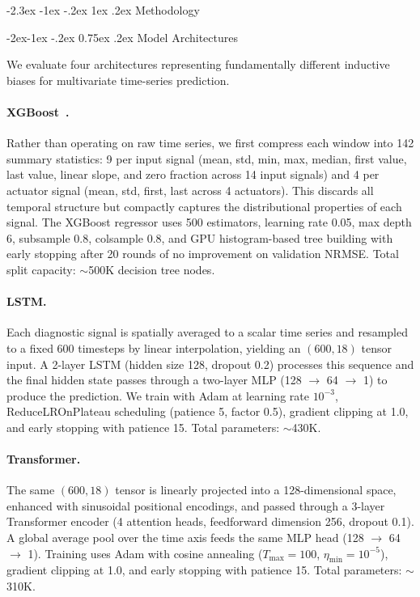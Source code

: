 \documentclass[10pt,twocolumn]{article}
\makeatletter
\renewcommand\section{\@startsection{section}{1}{\z@}%
  {-2.3ex \@plus -1ex \@minus -.2ex}%
  {1ex \@plus .2ex}%
  {\normalfont\Large\bfseries}}
\renewcommand\subsection{\@startsection{subsection}{2}{\z@}%
  {-2ex\@plus -1ex \@minus -.2ex}%
  {0.75ex \@plus .2ex}%
  {\normalfont\large\bfseries}}
\makeatother
\begin{document}
\section{Methodology}

\subsection{Model Architectures}

We evaluate four architectures representing fundamentally different
inductive biases for multivariate time-series prediction.

\paragraph{XGBoost~\cite{chen2016xgboost}.}
Rather than operating on raw time series, we first compress each window
into 142 summary statistics: 9 per input signal (mean, std, min, max,
median, first value, last value, linear slope, and zero fraction across
14 input signals) and 4 per actuator signal (mean, std, first, last
across 4 actuators). This discards all temporal structure but compactly
captures the distributional properties of each signal. The XGBoost
regressor uses 500 estimators, learning rate 0.05, max depth 6,
subsample 0.8, colsample 0.8, and GPU histogram-based tree building
with early stopping after 20 rounds of no improvement on validation
NRMSE. Total split capacity: $\sim$500K decision tree nodes.

\paragraph{LSTM.}
Each diagnostic signal is spatially averaged to a scalar time series
and resampled to a fixed 600 timesteps by linear interpolation,
yielding an $(600, 18)$ tensor input. A 2-layer LSTM (hidden size 128,
dropout 0.2) processes this sequence and the final hidden state passes
through a two-layer MLP (128 $\to$ 64 $\to$ 1) to produce the
prediction. We train with Adam at learning rate $10^{-3}$,
ReduceLROnPlateau scheduling (patience 5, factor 0.5), gradient
clipping at 1.0, and early stopping with patience 15. Total parameters:
$\sim$430K.

\paragraph{Transformer.}
The same $(600, 18)$ tensor is linearly projected into a 128-dimensional
space, enhanced with sinusoidal positional encodings, and passed through
a 3-layer Transformer encoder (4 attention heads, feedforward dimension
256, dropout 0.1). A global average pool over the time axis feeds the
same MLP head (128 $\to$ 64 $\to$ 1). Training uses Adam with cosine
annealing ($T_\mathrm{max}=100$, $\eta_\mathrm{min}=10^{-5}$), gradient
clipping at 1.0, and early stopping with patience 15. Total parameters:
$\sim$310K.
\end{document}

